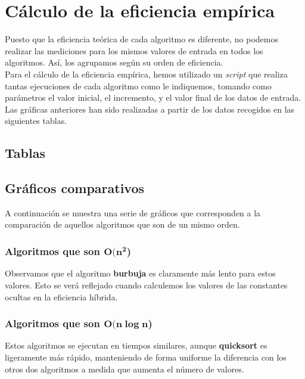 \documentclass[11pt]{article}
\begin{document}
\newpage
\section*{Cálculo de la eficiencia empírica}

Puesto que la eficiencia teórica de cada algoritmo es diferente, no podemos realizar las mediciones para los mismos valores de entrada en todos los algoritmos. Así, los agrupamos según su orden de eficiencia.\\

Para el cálculo de la eficiencia empírica, hemos utilizado un \textit{script} que realiza tantas ejecuciones de cada algoritmo como le indiquemos, tomando como parámetros el valor inicial, el incremento, y el valor final de los datos de entrada.\\

Las gráficas anteriores han sido realizadas a partir de los datos recogidos en las siguientes tablas.

\subsection*{Tablas}


\newpage
\subsection*{Gráficos comparativos}

A continuación se muestra una serie de gráficos que corresponden a la comparación de aquellos algoritmos que son de un mismo orden.

\subsubsection*{Algoritmos que son $\boldsymbol{O(n^2}$)}

\vspace{1em}
Observamos que el algoritmo \textbf{burbuja} es claramente más lento para estos valores. Esto se verá reflejado cuando calculemos los valores de las constantes ocultas en la eficiencia híbrida.


\subsubsection*{Algoritmos que son $\boldsymbol{O(n\log n}$)}

\vspace{1em}

Estos algoritmos se ejecutan en tiempos similares, aunque \textbf{quicksort} es ligeramente más rápido, manteniendo de forma uniforme la diferencia con los otros dos algoritmos a medida que aumenta el número de valores.
\end{document}
